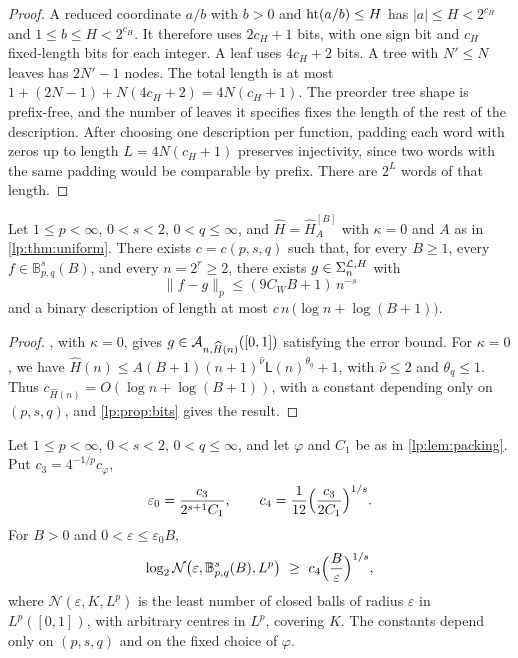 \documentclass[11pt,a4paper]{article}
\begin{document}
\begin{proof}
A reduced coordinate $a/b$ with $b>0$ and $\operatorname{ht}(a/b)\le H$ has $|a|\le H<2^{c_H}$ and $1\le b\le H<2^{c_H}$. It therefore uses $2c_H+1$ bits, with one sign bit and $c_H$ fixed-length bits for each integer. A leaf uses $4c_H+2$ bits. A tree with $N'\le N$ leaves has $2N'-1$ nodes. The total length is at most $1+(2N-1)+N(4c_H+2)=4N(c_H+1)$. The preorder tree shape is prefix-free, and the number of leaves it specifies fixes the length of the rest of the description. After choosing one description per function, padding each word with zeros up to length $L=4N(c_H+1)$ preserves injectivity, since two words with the same padding would be comparable by prefix. There are $2^L$ words of that length.
\end{proof}

\begin{corolario}
\label{lp:cor:bits}
Let $1\le p<\infty$, $0<s<2$, $0<q\le\infty$, and $\widehat H=\widehat H^{[B]}_{A}$ with $\kappa=0$ and $A$ as in \cref{lp:thm:uniform}. There exists $c=c(p,s,q)$ such that, for every $B\ge1$, every $f\in\mathbb B^s_{p,q}(B)$, and every $n=2^r\ge2$, there exists $g\in\Sigma_{n}^{\mathcal L,H}$ with
\[
 \|f-g\|_p\le(9C_WB+1)\,n^{-s}
\]
and a binary description of length at most $c\,n\,\bigl(\log n+\log(B+1)\bigr)$.
\end{corolario}

\begin{proof}
, with $\kappa=0$, gives $g\in\mathcal A_{n,\widehat H(n)}([0,1])$ satisfying the error bound. For $\kappa=0$, we have $\widehat H(n)\le A(B+1)(n+1)^{\hat\nu}\mathsf L(n)^{\theta_q}+1$, with $\hat\nu\le2$ and $\theta_q\le1$. Thus $c_{\widehat H(n)}=O(\log n+\log(B+1))$, with a constant depending only on $(p,s,q)$, and \cref{lp:prop:bits} gives the result.
\end{proof}

\begin{proposicao}
\label{lp:prop:entropy-lower}
Let $1\le p<\infty$, $0<s<2$, $0<q\le\infty$, and let $\varphi$ and $C_1$ be as in \cref{lp:lem:packing}. Put $c_3=4^{-1/p}c_\varphi$,
\[
\varepsilon_0=\frac{c_3}{2^{s+1}C_1},\qquad c_4=\frac1{12}\Bigl(\frac{c_3}{2C_1}\Bigr)^{1/s}.
\]
For $B>0$ and $0<\varepsilon\le\varepsilon_0B$,
\[
\log_2\mathcal N\bigl(\varepsilon,\mathbb B^s_{p,q}(B),L^p\bigr)\ \ge\ c_4\Bigl(\frac B\varepsilon\Bigr)^{1/s},
\]
where $\mathcal N(\varepsilon,K,L^p)$ is the least number of closed balls of radius $\varepsilon$ in $L^p([0,1])$, with arbitrary centres in $L^p$, covering $K$. The constants depend only on $(p,s,q)$ and on the fixed choice of $\varphi$.
\end{proposicao}
\end{document}
